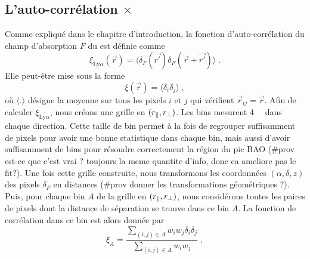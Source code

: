 \documentclass[11pt, twoside, a4paper, openright]{report}
\begin{document}
\subsection{L'auto-corrélation \lya{}$\times$\lya{}}
Comme expliqué dans le chapitre d'introduction, la fonction d'auto-corrélation du champ d'absorption $F$ du \lya{} est définie comme
\begin{equation}
  \xi_{\mathrm{Ly}\alpha}(\vec r) = \langle \delta_F(\vec{r'}) \delta_F(\vec{r} + \vec{r'}) \rangle \; .
\end{equation}
Elle peut-être mise sous la forme
\begin{equation}
  \xi(\vec r) = \langle \delta_i \delta_j \rangle \; ,
\end{equation}
où $\langle .\rangle$ désigne la moyenne sur tous les pixels $i$ et $j$ qui vérifient $\vec r_{ij} = \vec r$.
Afin de calculer $\xi_{\mathrm{Ly}\alpha}$, nous créons une grille en $(r_{\parallel}{}, r_{\perp}{})$.
Les bins mesurent \SI{4}{\perh\Mpc} dans chaque direction.
Cette taille de bin permet à la fois de regrouper suffisamment de pixels pour avoir une bonne statistique dans chaque bin, mais aussi d'avoir suffisamment de bins pour résoudre correctement la région du pic BAO (\#prov est-ce que c'est vrai ? toujours la meme quantite d'info, donc ca ameliore pas le fit?).
Une fois cette grille construite, nous transformons les coordonnées $(\alpha, \delta, z)$ des pixels $\delta_F$ en distances (\#prov donner les transformations géométriques ?).
Puis, pour chaque bin $A$ de la grille en $(r_{\parallel}{}, r_{\perp}{})$, nous considérons toutes les paires de pixels dont la distance de séparation se trouve dans ce bin $A$. La fonction de corrélation dans ce bin est alors donnée par
\begin{equation}
  \label{eq:xiff}
  \xi_A = \frac{
    \sum\limits_{(i,j)\in A} w_i w_j \delta_i \delta_j
  }{
    \sum\limits_{(i,j)\in A} w_i w_j
  }
  \; ,
\end{equation}
\end{document}
